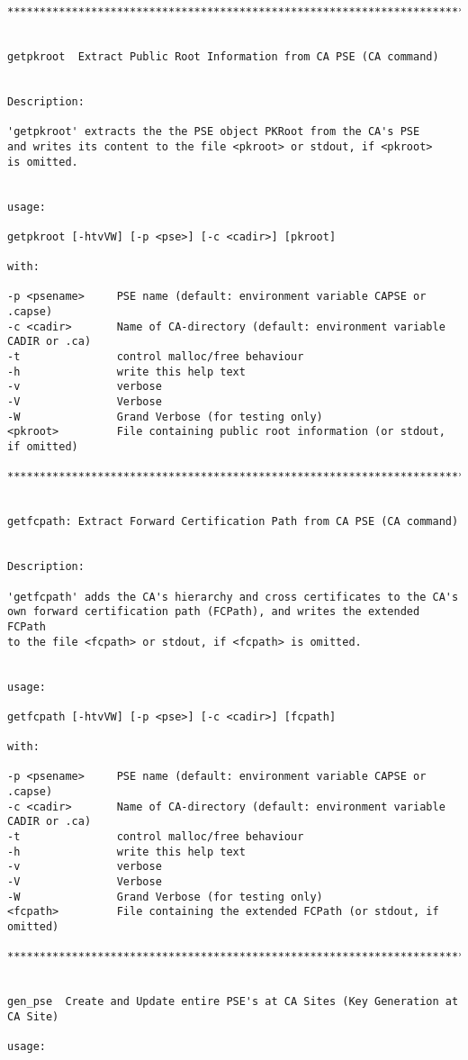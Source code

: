 {\begin{verbatim}
****************************************************************************************


getpkroot  Extract Public Root Information from CA PSE (CA command)


Description:

'getpkroot' extracts the the PSE object PKRoot from the CA's PSE
and writes its content to the file <pkroot> or stdout, if <pkroot>
is omitted.


usage:

getpkroot [-htvVW] [-p <pse>] [-c <cadir>] [pkroot]

with:

-p <psename>     PSE name (default: environment variable CAPSE or .capse)
-c <cadir>       Name of CA-directory (default: environment variable CADIR or .ca)
-t               control malloc/free behaviour
-h               write this help text
-v               verbose
-V               Verbose
-W               Grand Verbose (for testing only)
<pkroot>         File containing public root information (or stdout, if omitted)

****************************************************************************************


getfcpath: Extract Forward Certification Path from CA PSE (CA command)


Description:

'getfcpath' adds the CA's hierarchy and cross certificates to the CA's
own forward certification path (FCPath), and writes the extended FCPath
to the file <fcpath> or stdout, if <fcpath> is omitted.


usage:

getfcpath [-htvVW] [-p <pse>] [-c <cadir>] [fcpath]

with:

-p <psename>     PSE name (default: environment variable CAPSE or .capse)
-c <cadir>       Name of CA-directory (default: environment variable CADIR or .ca)
-t               control malloc/free behaviour
-h               write this help text
-v               verbose
-V               Verbose
-W               Grand Verbose (for testing only)
<fcpath>         File containing the extended FCPath (or stdout, if omitted)

****************************************************************************************


gen_pse  Create and Update entire PSE's at CA Sites (Key Generation at CA Site)

usage:


\end{verbatim}}
